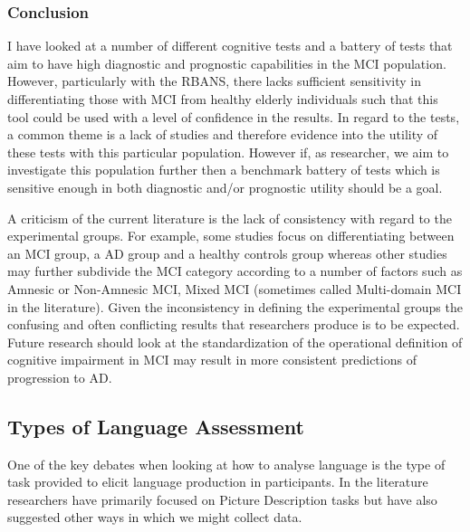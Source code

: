 \documentclass[12pt, twoside, a4paper]{article}
\begin{document}
\subsubsection{Conclusion}
I have looked at a number of different cognitive tests and a battery of tests that aim to have high diagnostic and prognostic capabilities in the MCI population. However, particularly with the RBANS, there lacks sufficient sensitivity in differentiating those with MCI from healthy elderly individuals such that this tool could be used with a level of confidence in the results. In regard to the tests, a common theme is a lack of studies and therefore evidence into the utility of these tests with this particular population. However if, as researcher, we aim to investigate this population further then a benchmark battery of tests which is sensitive enough in both diagnostic and/or prognostic utility should be a goal. 
\par 
A criticism of the current literature is the lack of consistency with regard to the experimental groups. For example, some studies focus on differentiating between an MCI group, a AD group and a healthy controls group whereas other studies may further subdivide the MCI category according to a number of factors such as Amnesic or Non-Amnesic MCI, Mixed MCI (sometimes called Multi-domain MCI in the literature). Given the inconsistency in defining the experimental groups the confusing and often conflicting results that researchers produce is to be expected. Future research should look at the standardization of the operational definition of cognitive impairment in MCI may result in more consistent predictions of progression to AD. 

\subsection{Types of Language Assessment}
One of the key debates when looking at how to analyse language is the type of task provided to elicit language production in participants. In the literature researchers have primarily focused on Picture Description tasks but have also suggested other ways in which we might collect data.
\par
\end{document}
